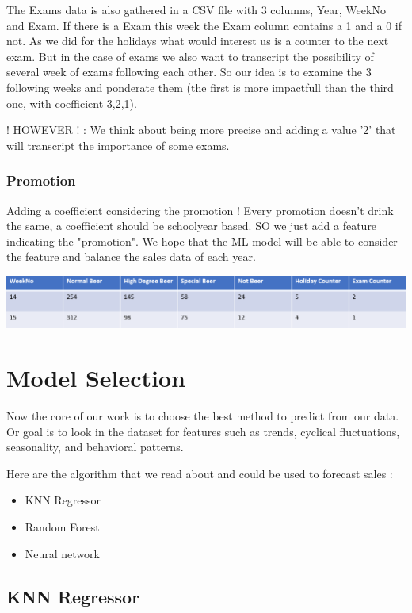 \documentclass{report}
\begin{document}
The Exams data is also gathered in a CSV file with 3 columns, Year, WeekNo and Exam. If there is a Exam this week the Exam column contains a 1 and a 0 if not. As we did for the holidays what would interest us is a counter to the next exam. But in the case of exams we also want to transcript the possibility of several week of exams following each other. So our idea is to examine the 3 following weeks and ponderate them (the first is more impactfull than the third one, with coefficient 3,2,1). 


! HOWEVER ! : We think about being more precise and adding a value '2' that will transcript the importance of some exams.

\subsection{Promotion}


Adding a coefficient considering the promotion ! Every promotion doesn't drink the same, a coefficient should be schoolyear based. SO we just add a feature indicating the "promotion". We hope that the ML model will be able to consider the feature and balance the sales data of each year.


\includegraphics[scale=0.7]{DataModel}


\chapter{Model Selection}

Now the core of our work is to choose the best method to predict from our data. Or goal is to look in the dataset for features such as trends, cyclical fluctuations, seasonality, and behavioral patterns.


Here are the algorithm that we read about and could be used to forecast sales :
\begin{itemize}
\item KNN Regressor
\item Random Forest
\item Neural network
\end{itemize}

\section{KNN Regressor}
\end{document}
